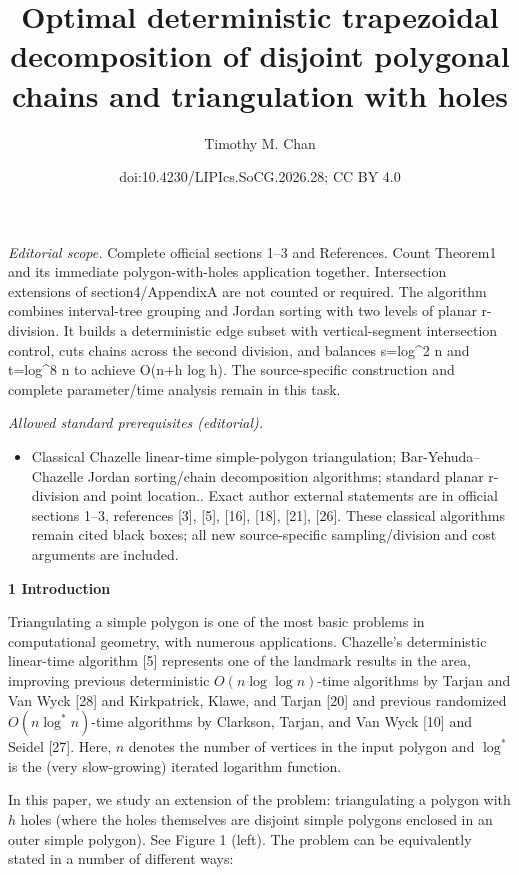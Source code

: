 \documentclass[10pt,a4paper]{article}
\title{Optimal deterministic trapezoidal decomposition of disjoint polygonal chains and triangulation with holes}
\author{Timothy M. Chan}
\date{doi:10.4230/LIPIcs.SoCG.2026.28; CC BY 4.0}
\begin{document}
\maketitle
\noindent\textit{Editorial scope.} Complete official sections 1–3 and References. Count Theorem1 and its immediate polygon-with-holes application together. Intersection extensions of section4/AppendixA are not counted or required. The algorithm combines interval-tree grouping and Jordan sorting with two levels of planar r-division. It builds a deterministic edge subset with vertical-segment intersection control, cuts chains across the second division, and balances s=log\textasciicircum{}2 n and t=log\textasciicircum{}8 n to achieve O(n+h log h). The source-specific construction and complete parameter/time analysis remain in this task.\par\medskip
\noindent\textit{Allowed standard prerequisites (editorial).}\begin{itemize}
\item Classical Chazelle linear-time simple-polygon triangulation; Bar-Yehuda–Chazelle Jordan sorting/chain decomposition algorithms; standard planar r-division and point location.. Exact author external statements are in official sections 1–3, references [3], [5], [16], [18], [21], [26]. These classical algorithms remain cited black boxes; all new source-specific sampling/division and cost arguments are included.
\end{itemize}\medskip
\par\medskip\noindent\textbf{1 Introduction}\par
Triangulating a simple polygon is one of the most basic problems in computational geometry, with numerous applications. Chazelle’s deterministic linear-time algorithm [5] represents one of the landmark results in the area, improving previous deterministic $O(n\log\log n)$-time algorithms by Tarjan and Van Wyck [28] and Kirkpatrick, Klawe, and Tarjan [20] and previous randomized $O(n\log^{*}n)$-time algorithms by Clarkson, Tarjan, and Van Wyck [10] and Seidel [27]. Here, $n$ denotes the number of vertices in the input polygon and $\log^{*}$ is the (very slow-growing) iterated logarithm function.
\par
\par
In this paper, we study an extension of the problem: triangulating a polygon with $h$ holes (where the holes themselves are disjoint simple polygons enclosed in an outer simple polygon). See Figure 1 (left). The problem can be equivalently stated in a number of different ways:
\end{document}
